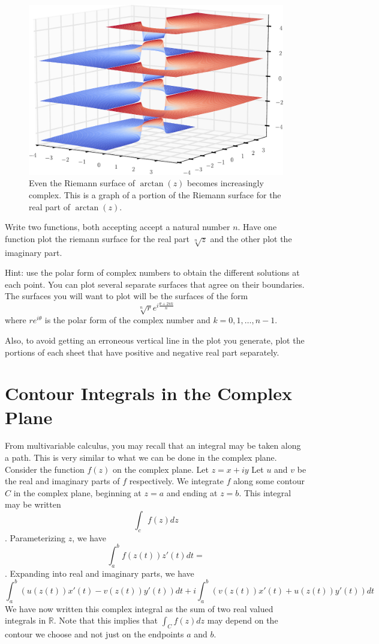 \begin{figure}
\includegraphics[width=\textwidth]{arctan_riemann_surface}
\caption{Even the Riemann surface of $\arctan(z)$ becomes increasingly complex.
This is a graph of a portion of the Riemann surface for the real part of $\arctan(z)$.}
\label{fig:arctan_riemann_surface}
\end{figure}

\begin{problem}
Write two functions, both accepting accept a natural number $n$.
Have one function plot the riemann surface for the real part $\sqrt[n]{z}$ and the other plot the imaginary part.

Hint: use the polar form of complex numbers to obtain the different solutions at each point.
You can plot several separate surfaces that agree on their boundaries.
The surfaces you will want to plot will be the surfaces of the form
\[\sqrt[n]{r} e^{i \frac{\theta + 2 \pi k}{n}}\]
where $r e^{i \theta}$ is the polar form of the complex number and $k = 0, 1, \dots, n-1$.

Also, to avoid getting an erroneous vertical line in the plot you generate, plot the portions of each sheet that have positive and negative real part separately.
\end{problem}

\section*{Contour Integrals in the Complex Plane}

From multivariable calculus, you may recall that an integral may be taken along a path.
This is very similar to what we can be done in the complex plane.
Consider the function $f(z)$ on the complex plane.
Let $z=x+iy$ Let $u$ and $v$ be the real and imaginary parts of $f$ respectively.
We integrate $f$ along some contour $C$ in the complex plane, beginning at $z=a$ and ending at $z=b$.
This integral may be written $$\int_c f(z)dz$$.
Parameterizing $z$, we have $$\int_a^b f(z(t))z'(t)dt=$$.
Expanding into real and imaginary parts, we have
$$\int_a^b (u(z(t))x'(t)-v(z(t))y'(t))dt +i \int_a^b(v(z(t))x'(t)+u(z(t))y'(t))dt$$
We have now written this complex integral as the sum of two real valued integrals in $\mathbb{R}$.
Note that this implies that $\int_C f(z) dz$ may depend on the contour we choose and not just on the endpoints $a$ and $b$.


